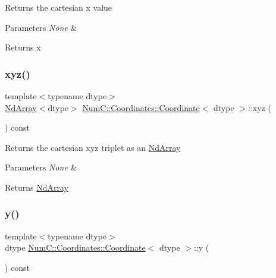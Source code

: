 Returns the cartesian x value


\begin{DoxyParams}{Parameters}
{\em None} & \\
\hline
\end{DoxyParams}
\begin{DoxyReturn}{Returns}
x 
\end{DoxyReturn}
\mbox{\label{class_num_c_1_1_coordinates_1_1_coordinate_a18a47b3def2e1c0b25c14048ccba5236}} 
\subsubsection{\texorpdfstring{xyz()}{xyz()}}
{\footnotesize\ttfamily template$<$typename dtype$>$ \\
\mbox{\hyperlink{class_num_c_1_1_nd_array}{Nd\+Array}}$<$dtype$>$ \mbox{\hyperlink{class_num_c_1_1_coordinates_1_1_coordinate}{Num\+C\+::\+Coordinates\+::\+Coordinate}}$<$ dtype $>$\+::xyz (\begin{DoxyParamCaption}{ }\end{DoxyParamCaption}) const\hspace{0.3cm}{\ttfamily [inline]}}

Returns the cartesian xyz triplet as an \mbox{\hyperlink{class_num_c_1_1_nd_array}{Nd\+Array}}


\begin{DoxyParams}{Parameters}
{\em None} & \\
\hline
\end{DoxyParams}
\begin{DoxyReturn}{Returns}
\mbox{\hyperlink{class_num_c_1_1_nd_array}{Nd\+Array}} 
\end{DoxyReturn}
\mbox{\label{class_num_c_1_1_coordinates_1_1_coordinate_a3ba1031707be3b25e9dfe070daff620a}} 
\subsubsection{\texorpdfstring{y()}{y()}}
{\footnotesize\ttfamily template$<$typename dtype$>$ \\
dtype \mbox{\hyperlink{class_num_c_1_1_coordinates_1_1_coordinate}{Num\+C\+::\+Coordinates\+::\+Coordinate}}$<$ dtype $>$\+::y (\begin{DoxyParamCaption}{ }\end{DoxyParamCaption}) const\hspace{0.3cm}{\ttfamily [inline]}}

